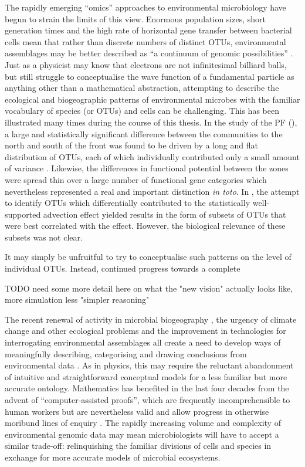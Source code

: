 The rapidly emerging ``omics'' approaches to environmental microbiology have begun to strain the limits of this view.
Enormous population sizes, short generation times and the high rate of horizontal gene transfer between bacterial cells mean that rather than discrete numbers of distinct \acp{OTU}, environmental assemblages may be better described as ``a continuum of genomic possibilities'' \cite{Goldenfeld:2007im}.
Just as a physicist may know that electrons are not infinitesimal billiard balls, but still struggle to conceptualise the wave function of a fundamental particle as anything other than a mathematical abstraction, attempting to describe the ecological and biogeographic patterns of environmental microbes with the familiar vocabulary of species (or \acp{OTU}) and cells can be challenging.
This has been illustrated many times during the course of this thesis.
In the study of the \ac{PF} (), a large and statistically significant difference between the communities to the north and south of the front was found to be driven by a long and flat distribution of \acp{OTU}, each of which individually contributed only a small amount of variance .
Likewise, the differences in functional potential between the zones were spread thin over a large number of functional gene categories  which nevertheless represented a real and important distinction \textit{in toto}.
In , the attempt to identify \acp{OTU} which differentially contributed to the statistically well-supported advection effect yielded results in the form of subsets of \acp{OTU} that were best correlated with the effect.
However, the biological relevance of these subsets was not clear.

It may simply be unfruitful to try to conceptualise such patterns on the level of individual \acp{OTU}.
Instead, continued progress towards a complete 

TODO need some more detail here on what the "new vision" actually looks like, more simulation less "simpler reasoning" 

The recent renewal of activity in microbial biogeography \cite{Ramette:2006jo}, the urgency of climate change and other ecological problems and the improvement in technologies for interrogating environmental assemblages all create a need to develop ways of meaningfully describing, categorising and drawing conclusions from environmental data \cite{Goldenfeld:2007im}.
As in physics, this may require the reluctant abandonment of intuitive and straightforward conceptual models for a less familiar but more accurate ontology.
Mathematics has benefited in the last four decades from the advent of ``computer-assisted proofs'', which are frequently incomprehensible to human workers but are nevertheless valid and allow progress in otherwise moribund lines of enquiry \citep[most famously, the proof of the Kepler conjecture by][]{Hales:2005um}.
The rapidly increasing volume and complexity of environmental genomic data may mean microbiologists will have to accept a similar trade-off: relinquishing the familiar divisions of cells and species in exchange for more accurate models of microbial ecosystems.

